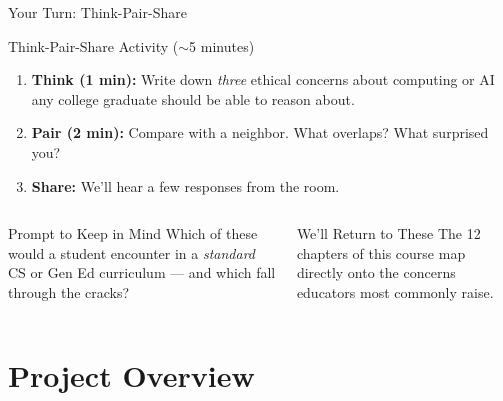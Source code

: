 \documentclass[aspectratio=169,10pt]{beamer}
\begin{document}
\begin{frame}{Your Turn: Think-Pair-Share}
\vspace{0.2em}
\begin{discussionbox}{Think-Pair-Share Activity ($\sim$5 minutes)}
\begin{enumerate}\small
  \item \textbf{Think (1 min):} Write down \emph{three} ethical concerns about computing or AI any college graduate should be able to reason about.
  \item \textbf{Pair (2 min):} Compare with a neighbor. What overlaps? What surprised you?
  \item \textbf{Share:} We'll hear a few responses from the room.
\end{enumerate}
\end{discussionbox}
\vspace{0.4em}
\begin{columns}[c]
\begin{block}{Prompt to Keep in Mind}
\small Which of these would a student encounter in a \emph{standard} CS or Gen Ed curriculum --- and which fall through the cracks?
\end{block}
\begin{block}{We'll Return to These}
\small The 12 chapters of this course map directly onto the concerns educators most commonly raise.
\end{block}
\end{columns}
\end{frame}

\section{Project Overview}
\end{document}
